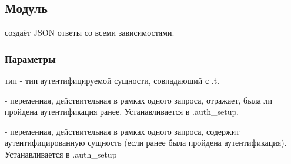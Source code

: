 \subsection{Модуль }\label{page-FPauth-responses-module-FPauth+u+responses-module-JSON-module-Make}%
 создаёт JSON ответы со всеми зависимостями.

\subsubsection{Параметры\label{parameters}}%
\label{page-FPauth-responses-module-FPauth+u+responses-module-JSON-module-Make-argument-1-Variables}\begin{ocamlindent}\label{page-FPauth-responses-module-FPauth+u+responses-module-JSON-module-Make-argument-1-Variables-type-entity}\begin{ocamlindent}тип  - тип аутентифицируемой сущности, совпадающий с .t.\end{ocamlindent}%
\medbreak
\label{page-FPauth-responses-module-FPauth+u+responses-module-JSON-module-Make-argument-1-Variables-val-authenticated}\begin{ocamlindent} - переменная, действительная в рамках одного запроса, отражает, была ли пройдена аутентификация ранее. Устанавливается в .auth\_setup.\end{ocamlindent}%
\medbreak
\label{page-FPauth-responses-module-FPauth+u+responses-module-JSON-module-Make-argument-1-Variables-val-current+u+user}\begin{ocamlindent} - переменная, действительная в рамках одного запроса, содержит аутентифицированную сущность (если ранее была пройдена аутентификация). Устанавливается в .auth\_setup\end{ocamlindent}%

\end{ocamlindent}
